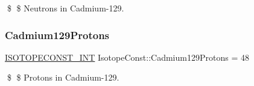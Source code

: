 \$ \$ Neutrons in Cadmium-\/129. \mbox{\label{group___isotope_const-_cadmium-_cd129_ga15a6b9712debbdd2aea07d04e10dc3db}} 
\subsubsection{\texorpdfstring{Cadmium129\+Protons}{Cadmium129Protons}}
{\footnotesize\ttfamily \mbox{\hyperlink{group___isotope_const-_macros_ga5f18360b3e99483a35c32d789e62621c}{I\+S\+O\+T\+O\+P\+E\+C\+O\+N\+S\+T\+\_\+\+I\+NT}} Isotope\+Const\+::\+Cadmium129\+Protons = 48}

\$ \$ Protons in Cadmium-\/129. 